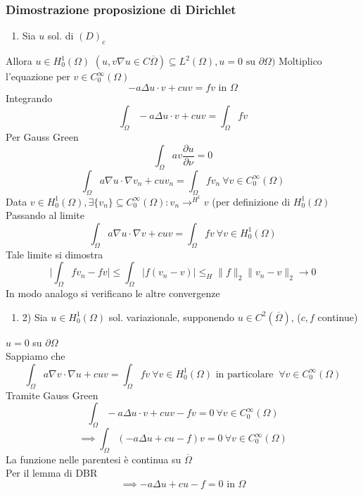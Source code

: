 \subsubsection{Dimostrazione proposizione di Dirichlet}
\begin{enumerate}
	\item Sia $u$ sol. di $(D)_c$

\end{enumerate}
Allora $u\in H_0^1(\Omega)$ $(u,v\nabla u\in C\overline{\Omega})\subseteq  L^{2}(\Omega),u=0\text{ su }\partial\Omega)$
Moltiplico l'equazione per $v\in C_0^\infty(\Omega)$ 
\[-a\Delta u\cdot v+cuv=fv\text{ in }\Omega\]
Integrando
\[\int_{\Omega}^{} -a\Delta u\cdot v+cuv=\int_{\Omega}^{} fv\]
Per Gauss Green
\[\int_{\Omega}^{} av \frac{\partial u}{\partial \nu}=0\]
\[\int_{\Omega}^{} a\nabla u\cdot \nabla v_n+cuv_n=\int_{\Omega}^{} fv_n\ \forall v\in C_0^\infty(\Omega) \]
Data $v\in H_0^1(\Omega),\exists \{v_n\} \subseteq  C_0^\infty(\Omega):v_n\to ^{H^1}v$ (per definizione di $H^1_0(\Omega)$ 
\\Passando al limite
\[\int_{\Omega}^{} a\nabla u\cdot \nabla v+cuv=\int_{\Omega}^{} fv\ \forall v\in H_0^1(\Omega) \]
Tale limite si dimostra
\[\bigg|\int_{\Omega}^{} fv_n-fv\bigg|\le \int_{\Omega}^{} |f(v_n-v)|\le_H \|f\|_2 \|v_n-v\|_2\to 0\]
In modo analogo si verificano le altre convergenze
\begin{enumerate}
	\item 2) Sia $u\in H_0^1(\Omega)$ sol. variazionale, supponendo $u\in C^2(\overline{\Omega})$, ($c,f$ continue)
\end{enumerate}
$u=0$ su $\partial\Omega$ 
\\Sappiamo che
\[\int_{\Omega}^{} a\nabla v\cdot \nabla u+cuv=\int_{\Omega}^{} fv\ \forall v\in H^1_0(\Omega)\text{ in particolare }\ \forall v\in C_0^\infty(\Omega)\]
Tramite Gauss Green
\[\int_{\Omega}^{} -a\Delta u\cdot v+cuv-fv=0\ \forall v\in C_0^\infty(\Omega)\]
\[\implies \int_{\Omega}^{} (-a\Delta u+cu -f)v=0\ \forall v\in C_0^\infty(\Omega)\]
La funzione nelle parentesi è continua su $\overline{\Omega}$
\\Per il lemma di DBR
\[\implies -a\Delta u+cu-f=0\text{ in }\Omega\]
